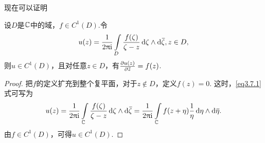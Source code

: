现在可以证明
\begin{theorem}\label{thm3.7.3}
  设$D$是$\mathbb C$中的域，$f\in C^1(D)$.令
  \begin{equation}\label{eq3.7.1}
    u(z) = \frac1{2\uppi\mathrm i}\int\limits_D\frac{f(\zeta)}{\zeta-z}\mathop{}\!\mathrm{d} \zeta\wedge\mathop{}\!\mathrm{d} {}\mkern2mu\overline{\mkern-2mu\zeta},z\in D,
  \end{equation}
  则$u\in C^1(D)$，且对任意$z\in D$，有$\frac{\partial u(z)}{\partial {}\mkern2mu\overline{\mkern-2muz}}=f(z)$.
\end{theorem}
\begin{proof}
  把$f$的定义扩充到整个复平面，对于$z\notin D$，定义$f(z)=0$. 这时，\eqref{eq3.7.1} 式可写为
  \[
    u(z) = \frac1{2\uppi\mathrm i}\int\limits_\mathbb C\frac{f(\zeta)}{\zeta-z}\mathop{}\!\mathrm{d} \zeta\wedge\mathop{}\!\mathrm{d} {}\mkern2mu\overline{\mkern-2mu\zeta} = \frac1{2\uppi\mathrm i}\int\limits_\mathbb C f(z+\eta)\frac1\eta\mathop{}\!\mathrm{d} \eta\wedge\mathop{}\!\mathrm{d} {}\mkern2mu\overline{\mkern-2mu\eta}.
  \]
  由$f\in C^1(D)$，可得$u\in C^1(D)$.


\end{proof}
